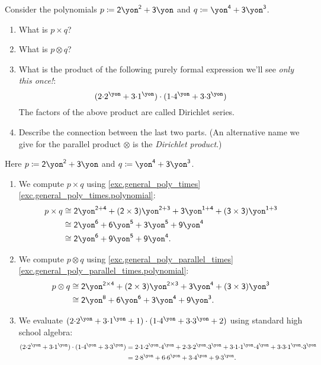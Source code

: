 \documentclass[Book-Poly]{subfiles}
\begin{document}
\begin{exercise}
Consider the polynomials $p\coloneqq \2\yon^\2+\3\yon$ and $q\coloneqq\yon^\4+\3\yon^\3$.
\begin{enumerate}
	\item What is $p\times q$?
	\item What is $p\otimes q$?
	\item What is the product of the following purely formal expression we'll see \emph{only this once!}:
	\[
	(2\mdot2^\yon+3\mdot 1^\yon) \cdot
	(1\mdot4^\yon+3\mdot 3^\yon)
	\]
    The factors of the above product are called Dirichlet series.
	\item Describe the connection between the last two parts. (An alternative name we give for the parallel product $\otimes$ is the \emph{Dirichlet product}.) \qedhere
\end{enumerate}
\begin{solution}
Here $p\coloneqq \2\yon^\2+\3\yon$ and $q\coloneqq\yon^\4+\3\yon^\3$.
\begin{enumerate}
    \item We compute $p \times q$ using \cref{exc.general_poly_times} \cref{exc.general_poly_times.polynomial}:
    \begin{align*}
        p \times q &\iso \2\yon^{\2 + \4} + (\2 \times \3)\yon^{\2 + \3} + \3\yon^{\1 + \4} + (\3 \times \3)\yon^{\1 + \3} \\
        &\iso \2\yon^\6 + \6\yon^\5 + \3\yon^\5 + \9\yon^\4 \\
        &\iso \2\yon^\6 + \9\yon^\5 + \9\yon^\4.
    \end{align*}

    \item We compute $p \otimes q$ using \cref{exc.general_poly_parallel_times} \cref{exc.general_poly_parallel_times.polynomial}:
    \begin{align*}
        p \otimes q &\iso \2\yon^{\2 \times \4} + (\2 \times \3)\yon^{\2 \times \3} + \3\yon^\4 + (\3 \times \3)\yon^\3 \\
        &\iso \2\yon^\8 + \6\yon^\6 + \3\yon^\4 + \9\yon^\3.
    \end{align*}

    \item We evaluate $(2\mdot2^\yon+3\mdot 1^\yon+1) \cdot
	(1\mdot4^\yon+3\mdot 3^\yon+2)$ using standard high school algebra:
    \begin{align*}
	    (2\mdot2^\yon+3\mdot 1^\yon) \cdot (1\mdot4^\yon+3\mdot 3^\yon) &= 2\mdot1\mdot2^\yon\mdot4^\yon + 2\mdot3\mdot2^\yon\mdot3^\yon + 3\mdot1\mdot1^\yon\mdot4^\yon + 3\mdot3\mdot1^\yon\mdot3^\yon \\
	    &= 2\mdot8^\yon + 6\mdot6^\yon + 3\mdot4^\yon + 9\mdot3^\yon.
	\end{align*}


\end{enumerate}
\end{solution}
\end{exercise}
\end{document}
